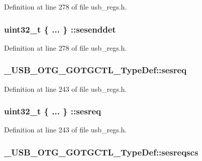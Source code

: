 Definition at line 278 of file usb\-\_\-regs.\-h.

\hypertarget{group___u_s_b___o_t_g___d_r_i_v_e_r_ga818520087c025476280350ee701f73bb}{
\subsubsection[{sesenddet}]{\setlength{\rightskip}{0pt plus 5cm}uint32\-\_\-t \{ ... \} \-::sesenddet}}\label{group___u_s_b___o_t_g___d_r_i_v_e_r_ga818520087c025476280350ee701f73bb}


Definition at line 278 of file usb\-\_\-regs.\-h.

\hypertarget{group___u_s_b___o_t_g___d_r_i_v_e_r_gaae14bcb1524970983dc360d7e3d79fea}{
\subsubsection[{sesreq}]{ \-\_\-\-U\-S\-B\-\_\-\-O\-T\-G\-\_\-\-G\-O\-T\-G\-C\-T\-L\-\_\-\-Type\-Def\-::sesreq}}\label{group___u_s_b___o_t_g___d_r_i_v_e_r_gaae14bcb1524970983dc360d7e3d79fea}


Definition at line 243 of file usb\-\_\-regs.\-h.

\hypertarget{group___u_s_b___o_t_g___d_r_i_v_e_r_ga400d6aee07de0ed630a7a96a1dda4d28}{
\subsubsection[{sesreq}]{\setlength{\rightskip}{0pt plus 5cm}uint32\-\_\-t \{ ... \} \-::sesreq}}\label{group___u_s_b___o_t_g___d_r_i_v_e_r_ga400d6aee07de0ed630a7a96a1dda4d28}


Definition at line 243 of file usb\-\_\-regs.\-h.

\hypertarget{group___u_s_b___o_t_g___d_r_i_v_e_r_gab0d6bf182833ffbcb57a537824c74db0}{
\subsubsection[{sesreqscs}]{ \-\_\-\-U\-S\-B\-\_\-\-O\-T\-G\-\_\-\-G\-O\-T\-G\-C\-T\-L\-\_\-\-Type\-Def\-::sesreqscs}}\label{group___u_s_b___o_t_g___d_r_i_v_e_r_gab0d6bf182833ffbcb57a537824c74db0}


